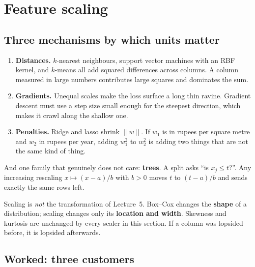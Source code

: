 \documentclass[11pt]{article}
\begin{document}
\section{Feature scaling}
\label{sec:scale}

\subsection{Three mechanisms by which units matter}

\begin{enumerate}[leftmargin=*]
  \item \textbf{Distances.} $k$-nearest neighbours, support vector machines
    with an RBF kernel, and $k$-means all add squared differences across
    columns. A column measured in large numbers contributes large squares and
    dominates the sum.
  \item \textbf{Gradients.} Unequal scales make the loss surface a long thin
    ravine. Gradient descent must use a step size small enough for the
    steepest direction, which makes it crawl along the shallow one.
  \item \textbf{Penalties.} Ridge and lasso shrink $\|w\|$. If $w_1$ is in
    rupees per square metre and $w_2$ in rupees per year, adding $w_1^2$ to
    $w_2^2$ is adding two things that are not the same kind of thing.
\end{enumerate}

And one family that genuinely does not care: \textbf{trees}. A split asks
``is $x_j \le t$?''. Any increasing rescaling $x \mapsto (x-a)/b$ with $b > 0$
moves $t$ to $(t-a)/b$ and sends exactly the same rows left.

\begin{caution}
Scaling is \emph{not} the transformation of Lecture~5. Box--Cox changes the
\textbf{shape} of a distribution; scaling changes only its \textbf{location and
width}. Skewness and kurtosis are unchanged by every scaler in this section.
If a column was lopsided before, it is lopsided afterwards.
\end{caution}

\subsection{Worked: three customers}
\label{sec:threecust}
\end{document}

